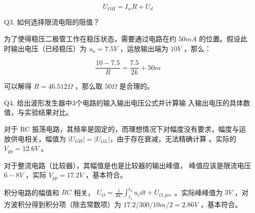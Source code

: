 \documentclass[lang=cn,11pt,a4paper,cite=authoryear]{elegantpaper}
\begin{document}
\[U_{OH } = I_w R + U_d \]



Q3. 如何选择限流电阻的阻值？


为了使得稳压二极管工作在稳压状态，需要通过电路在约 \(50 mA\) 的位置。假设此时输出电压（已经稳压）为 \(u_o = 7.5 V\) ，运放输出端为 \(10 V\) ，那么：

\[\frac{10 - 7.5}{R} = \frac{7.5}{2 k} + 50 m\]

可以解得 \(R = 46.512 \Omega\) ，那么取 \(50 \Omega\) 是合理的。


Q4. 给出波形发生器中3个电路的输入输出电压公式并计算输
入输出电压的具体数值，与实验结果对比。

对于 RC 振荡电路，其频率是固定的，而理想情况下对幅度没有要求，幅度与运放供电相关，幅值为 \(|U_{OH}|  = |U_{OL} |\)，由于存在衰减，无法精确计算 。实际的 \(V_{pp } = 12.6 V\) 。

对于整流电路（比较器），其幅值是也是比较器的输出峰值， 峰值应该是限流电压 \(6-8V\) ，实际 \(V_{pp} = 17.2 V \)  ，基本符合。

积分电路的幅值和 \(RC\) 相关， \(U_{O} = \frac{1}{RC} \int_{t_1}^{t_2} u_{i} \dd{t} + U_{O,pre} \) 。实际峰峰值为 \(3 V\) ，对方波积分得到积分项（除去常数项）为 \(17.2 / 300 / 10 m / 2 = 2.86 V\) ，基本符合。


\end{document}
